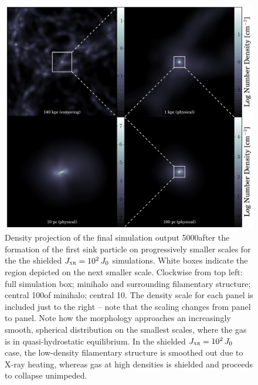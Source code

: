 \documentclass[../thesis.tex]{subfiles}
\begin{document}
\begin{figure}
  \begin{center}
    \includegraphics[width=\textwidth]{figures/structure/structure-xr_tau2_J2_t0}
    \caption{Density projection of the final simulation output 5000\yr after the formation of the first sink particle on progressively smaller scales for the the shielded $J_{\textsc{xr}}=10^2\,J_0$ simulations.  White boxes indicate the region depicted on the next smaller scale.  Clockwise from top left: full simulation box; minihalo and surrounding filamentary structure; central 100\pc of minihalo; central 10\pc.  The density scale for each panel is included just to the right -- note that the scaling changes from panel to panel. Note how the morphology approaches an increasingly smooth, spherical distribution on the smallest scales, where the gas is in quasi-hydrostatic equilibrium.  In the shielded $J_{\textsc{xr}}=10^2\,J_0$ case, the low-density filamentary structure is smoothed out due to X-ray heating, whereas gas at high densities is shielded and proceeds to collapse unimpeded.}
    \label{zoom-in2}
  \end{center}
\end{figure}
\end{document}
